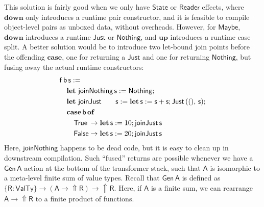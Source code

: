 \documentclass[acmsmall,screen]{acmart}
\newcommand{\msf}[1]{{\mathsf{#1}}}
\newcommand{\mbf}[1]{{\mathbf{#1}}}
\newcommand{\ind}{\hspace{1em}}
\newcommand{\of}{\mbf{of}\,}
\newcommand{\letdef}{\mbf{let\,}}
\newcommand{\vA}{\mathsf{A}}
\newcommand{\vR}{\mathsf{R}}
\newcommand{\vb}{\mathsf{b}}
\newcommand{\vf}{\mathsf{f}}
\newcommand{\vs}{\mathsf{s}}
\newcommand{\Reader}{\msf{Reader}}
\newcommand{\case}{\mbf{case\,}}
\newcommand{\Up}{{\Uparrow}}
\newcommand{\VTy}{\msf{ValTy}}
\newcommand{\True}{\msf{True}}
\newcommand{\False}{\msf{False}}
\newcommand{\Maybe}{\msf{Maybe}}
\newcommand{\Nothing}{\msf{Nothing}}
\newcommand{\Just}{\msf{Just}}
\theoremstyle{remark}
\newcommand{\mup}{\mbf{up}}
\newcommand{\mdown}{\mbf{down}}
\newcommand{\Gen}{\msf{Gen}}
\newcommand{\State}{\msf{State}}
\begin{document}
This solution is fairly good when we only have $\State$ or $\Reader$ effects, where
$\mdown$ only introduces a runtime pair constructor, and it is feasible to
compile object-level pairs as unboxed data, without overheads. However, for
$\Maybe$, $\mdown$ introduces a runtime $\Just$ or $\Nothing$, and $\mup$
introduces a runtime case split. A better solution would be to introduce two
let-bound join points before the offending $\mbf{case}$, one for returning a
$\Just$ and one for returning $\Nothing$, but fusing away the actual runtime
constructors:
\begin{alignat*}{3}
  & \vf\,\vb\,\vs :=\\
  & \ind \letdef\,\msf{joinNothing}\,\vs := \Nothing;\\
  & \ind \letdef\,\msf{joinJust}\,\hspace{1.8em}\vs := \letdef \vs := \vs + \vs; \Just\,((),\,\vs);\\
  & \ind \case \msf{b}\,\of\\
  & \ind \ind \True\hspace{0.2em}  \to \letdef \vs := 10; \msf{joinJust}\,\vs\\
  & \ind \ind \False \to \letdef \vs := 20; \msf{joinJust}\,\vs
\end{alignat*}
Here, $\msf{joinNothing}$ happens to be dead code, but it is easy to clean up in
downstream compilation. Such ``fused'' returns are possible whenever we have a
$\Gen\,\vA$ action at the bottom of the transformer stack, such that $\vA$ is
isomorphic to a meta-level finite sum of value types. Recall that $\Gen\,\vA$ is
defined as $\{\vR : \VTy\} \to (\vA \to \Up \vR) \to \Up \vR$. Here, if $\vA$ is
a finite sum, we can rearrange $\vA \to \Up \vR$ to a finite product of
functions.
\end{document}
